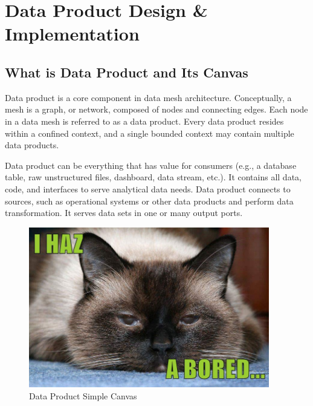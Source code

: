 \documentclass[12pt, a4paper]{book}
\begin{document}
\let\cleardoublepage\clearpage
\chapter{Data Product Design \& Implementation}
\section{What is Data Product and Its Canvas}
Data product is a core component in data mesh architecture. Conceptually, a mesh is a graph, or network, composed of nodes and connecting edges. Each node in a data mesh is referred to as a data product. Every data product resides within a confined context, and a single bounded context may contain multiple data products.

Data product can be everything that has value for consumers (e.g., a database table, raw unstructured files, dashboard, data stream, etc.). It contains all data, code, and interfaces to serve analytical data needs. Data product connects to sources, such as operational systems or other data products and perform data transformation. It serves data sets in one or many output ports. \cite{datameshweb}

\begin{figure}[h]
	\vspace*{-.3cm}
	\begin{framed}
		\centering
		\includegraphics[width=10.5cm]{boring.jpg}
		\caption{Data Product Simple Canvas}
		\label{DPCanvas}
	\end{framed}
\end{figure}
\end{document}
